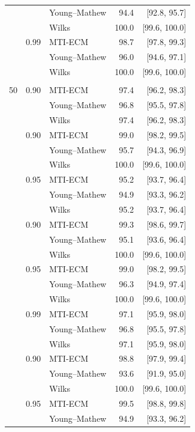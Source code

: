 \begin{longtable}{@{}rrlrr@{}}
 &  & Young--Mathew & 94.4 & [92.8, 95.7] \\
 &  & Wilks & 100.0 & [99.6, 100.0] \\
\addlinespace[0.2em]
1000 & 0.99 & MTI-ECM & 98.7 & [97.8, 99.3] \\
 &  & Young--Mathew & 96.0 & [94.6, 97.1] \\
 &  & Wilks & 100.0 & [99.6, 100.0] \\
\addlinespace[0.2em]
\multicolumn{5}{@{}l}{\textit{Exponential}}\\
50 & 0.90 & MTI-ECM & 97.4 & [96.2, 98.3] \\
 &  & Young--Mathew & 96.8 & [95.5, 97.8] \\
 &  & Wilks & 97.4 & [96.2, 98.3] \\
\addlinespace[0.2em]
100 & 0.90 & MTI-ECM & 99.0 & [98.2, 99.5] \\
 &  & Young--Mathew & 95.7 & [94.3, 96.9] \\
 &  & Wilks & 100.0 & [99.6, 100.0] \\
\addlinespace[0.2em]
100 & 0.95 & MTI-ECM & 95.2 & [93.7, 96.4] \\
 &  & Young--Mathew & 94.9 & [93.3, 96.2] \\
 &  & Wilks & 95.2 & [93.7, 96.4] \\
\addlinespace[0.2em]
500 & 0.90 & MTI-ECM & 99.3 & [98.6, 99.7] \\
 &  & Young--Mathew & 95.1 & [93.6, 96.4] \\
 &  & Wilks & 100.0 & [99.6, 100.0] \\
\addlinespace[0.2em]
500 & 0.95 & MTI-ECM & 99.0 & [98.2, 99.5] \\
 &  & Young--Mathew & 96.3 & [94.9, 97.4] \\
 &  & Wilks & 100.0 & [99.6, 100.0] \\
\addlinespace[0.2em]
500 & 0.99 & MTI-ECM & 97.1 & [95.9, 98.0] \\
 &  & Young--Mathew & 96.8 & [95.5, 97.8] \\
 &  & Wilks & 97.1 & [95.9, 98.0] \\
\addlinespace[0.2em]
1000 & 0.90 & MTI-ECM & 98.8 & [97.9, 99.4] \\
 &  & Young--Mathew & 93.6 & [91.9, 95.0] \\
 &  & Wilks & 100.0 & [99.6, 100.0] \\
\addlinespace[0.2em]
1000 & 0.95 & MTI-ECM & 99.5 & [98.8, 99.8] \\
 &  & Young--Mathew & 94.9 & [93.3, 96.2] \\

\end{longtable}
